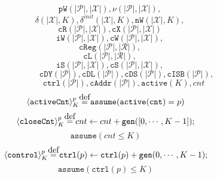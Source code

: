 \documentclass{article}
\newcommand{\var}{\texttt}
\newcommand\myeq{\stackrel{\mathclap{\normalfont\mbox{def}}}{=}}
\begin{document}
$$ \quad\var{pW}(|\mathcal{P}|,|\mathcal{X}|), \nu(|\mathcal{P}|,|\mathcal{X}|), $$
$$ \quad\delta(|\mathcal{X}|,K), \delta^{init}(|\mathcal{X}|,K), \var{nW}(|\mathcal{X}|,K),$$
$$ \quad\var{cR}(|\mathcal{P}|,|\mathcal{X}|), \var{cX}(|\mathcal{P}|,|\mathcal{X}|)$$
$$ \quad\var{iW}(|\mathcal{P}|,|\mathcal{X}|), \var{cW}(|\mathcal{P}|,|\mathcal{X}|),$$
$$ \quad\var{cReg}(|\mathcal{P}|,|\mathcal{R}|),$$
$$ \quad\var{cL}(|\mathcal{P}|,|\mathcal{R}|),$$
$$ \quad\var{iS}(|\mathcal{P}|,|\mathcal{X}|), \var{cS}(|\mathcal{P}|,|\mathcal{X}|),$$
$$ \qquad\qquad\quad\var{cDY}(|\mathcal{P}|), \var{cDL}(|\mathcal{P}|),\var{cDS}(|\mathcal{P}|),\var{cISB}(|\mathcal{P}|),$$
$$ \qquad\qquad\;\var{ctrl}(|\mathcal{P}|),\var{cAddr}(|\mathcal{P}|),\var{active}(K), cnt$$
\vspace{-1.2em}
$$\langle \texttt{activeCnt} \rangle_K^p \myeq \texttt{assume}(\texttt{active}(\texttt{cnt}) = p)$$
\vspace{-1.2em}
$$\langle \texttt{closeCnt} \rangle_K^p \myeq cnt \leftarrow cnt + \texttt{gen}([0,\cdots,K-1]);$$
\vspace{-1.7em}
$$ \texttt{assume}(cnt \leq K)$$
\vspace{-1.2em}
$$ \langle \texttt{control} \rangle_K^p \myeq \texttt{ctrl}(p) \leftarrow \texttt{ctrl}(p) + \texttt{gen}(0,\cdots,K-1);$$
\vspace{-1.7em}
$$ \texttt{assume}(\texttt{ctrl}(p) \leq K)$$
\end{document}
